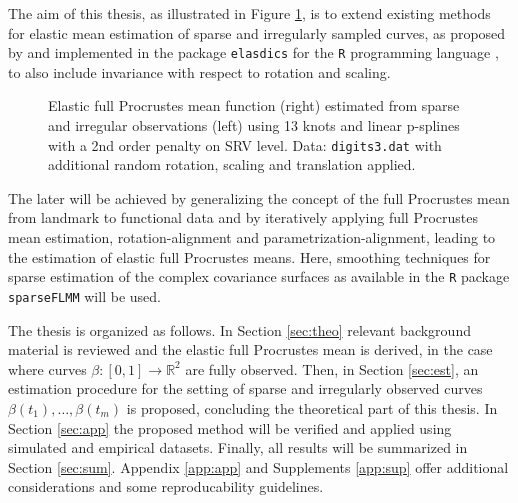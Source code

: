 The aim of this thesis, as illustrated in Figure \ref{fig:1-mean}, is to extend existing methods for elastic mean estimation of sparse and irregularly sampled curves, as proposed by \cite{Steyer2021} and implemented in the package \texttt{elasdics} \parencite{elasdics} for the \texttt{R} programming language \parencite{R}, to also include invariance with respect to rotation and scaling.
\begin{figure}
  \centering
  \begin{subfigure}{.48\textwidth}
    \centering
  \end{subfigure}\hfill%
  \begin{subfigure}{.48\textwidth}
    \centering
  \end{subfigure}
  \caption{Elastic full Procrustes mean function (right) estimated from sparse and irregular observations (left) using 13 knots and linear p-splines with a 2nd order penalty on SRV level. Data: \texttt{digits3.dat} with additional random rotation, scaling and translation applied.}
  \label{fig:1-mean}
\end{figure}
The later will be achieved by generalizing the concept of the full Procrustes mean from landmark to functional data and by iteratively applying full Procrustes mean estimation, rotation-alignment and parametrization-alignment, leading to the estimation of elastic full Procrustes means.
Here, smoothing techniques for sparse estimation of the complex covariance surfaces as available in the \texttt{R} package \texttt{sparseFLMM} \parencite{sparseFLMM} will be used.


The thesis is organized as follows.
In Section \ref{sec:theo} relevant background material is reviewed and the elastic full Procrustes mean is derived, in the case where curves $\beta:[0,1] \rightarrow \mathbb{R}^2$ are fully observed. 
Then, in Section \ref{sec:est}, an estimation procedure for the setting of sparse and irregularly observed curves $\beta(t_1), \dots, \beta(t_m)$ is proposed, concluding the theoretical part of this thesis.
In Section \ref{sec:app} the proposed method will be verified and applied using simulated and empirical datasets.
Finally, all results will be summarized in Section \ref{sec:sum}.
Appendix \ref{app:app} and Supplements \ref{app:sup} offer additional considerations and some reproducability guidelines.

\newpage
